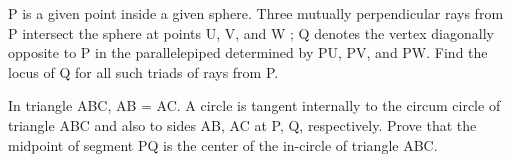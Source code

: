 \item P is a given point inside a given sphere. Three mutually perpendicular rays from P intersect the sphere at points U, V, and W ; Q denotes the vertex diagonally opposite to P in the parallelepiped determined by PU, PV, and PW. Find the locus of Q for all such triads of rays from P.

\item In triangle ABC, AB = AC. A circle is tangent internally to the circum circle of triangle ABC and also to sides AB, AC at P, Q, respectively. Prove that the midpoint of segment PQ is the center of the in-circle of triangle ABC.


